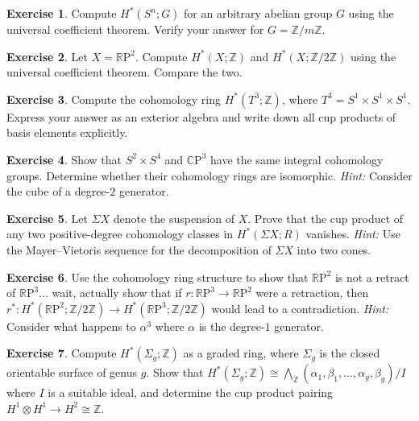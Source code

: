 \documentclass[12pt,a4paper,openany]{book}
\theoremstyle{definition}
\newtheorem{exercise}{Exercise}[chapter]
\theoremstyle{plain}
\theoremstyle{remark}
\newcommand{\Z}{\mathbb{Z}}
\newcommand{\RP}{\mathbb{R}\mathrm{P}}
\newcommand{\CP}{\mathbb{C}\mathrm{P}}
\begin{document}
\begin{exercise}
Compute $H^*(S^n;G)$ for an arbitrary abelian group $G$ using the
universal coefficient theorem. Verify your answer for $G=\Z/m\Z$.
\end{exercise}

\begin{exercise}
Let $X=\RP^2$. Compute $H^*(X;\Z)$ and $H^*(X;\Z/2\Z)$ using the
universal coefficient theorem. Compare the two.
\end{exercise}

\begin{exercise}
Compute the cohomology ring $H^*(T^3;\Z)$, where $T^3=S^1\times S^1\times S^1$. Express your answer as an exterior algebra and write down all cup products of basis elements explicitly.
\end{exercise}

\begin{exercise}
Show that $S^2\times S^4$ and $\CP^3$ have the same integral cohomology
groups. Determine whether their cohomology rings are isomorphic.
\textit{Hint:} Consider the cube of a degree-$2$ generator.
\end{exercise}

\begin{exercise}
Let $\Sigma X$ denote the suspension of $X$. Prove that the cup product
of any two positive-degree cohomology classes in $H^*(\Sigma X;R)$
vanishes. \textit{Hint:} Use the Mayer--Vietoris sequence for the
decomposition of $\Sigma X$ into two cones.
\end{exercise}

\begin{exercise}
Use the cohomology ring structure to show that $\RP^2$ is not a
retract of $\RP^3$... wait, actually show that if $r\colon\RP^3\to\RP^2$
were a retraction, then $r^*\colon H^*(\RP^2;\Z/2\Z)\to H^*(\RP^3;\Z/2\Z)$
would lead to a contradiction. \textit{Hint:} Consider what happens
to $\alpha^3$ where $\alpha$ is the degree-$1$ generator.
\end{exercise}

\begin{exercise}
Compute $H^*(\Sigma_g;\Z)$ as a graded ring, where $\Sigma_g$ is the
closed orientable surface of genus $g$. Show that $H^*(\Sigma_g;\Z)
\cong\bigwedge_\Z(\alpha_1,\beta_1,\ldots,\alpha_g,\beta_g)/I$
where $I$ is a suitable ideal, and determine the cup product pairing
$H^1\otimes H^1\to H^2\cong\Z$.
\end{exercise}
\end{document}
